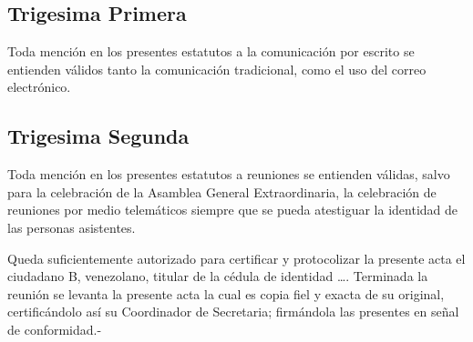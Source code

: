     \subsection{Trigesima Primera}
      Toda menci\'on en los presentes estatutos a la comunicaci\'on por escrito
      se entienden v\'alidos tanto la comunicaci\'on tradicional, como el uso
      del correo electr\'onico.
      
    \subsection{Trigesima Segunda}
      Toda menci\'on en los presentes estatutos a reuniones se entienden
      v\'alidas, salvo para la celebraci\'on de la Asamblea General
      Extraordinaria, la celebraci\'on de reuniones por medio telem\'aticos
      siempre que se pueda atestiguar la identidad de las personas asistentes.
      
      Queda suficientemente autorizado para certificar y protocolizar la
      presente acta el ciudadano B, venezolano, titular de la c\'edula de
      identidad \textnumero \ldots. Terminada la reuni\'on se levanta la
      presente acta la cual es copia fiel y exacta de su original,
      certific\'andolo as\'i{} su Coordinador de Secretaria; firm\'andola las
      presentes en se\~nal de conformidad.-
